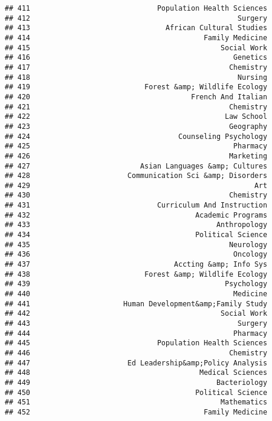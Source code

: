\documentclass[
]{article}
\begin{document}
\begin{verbatim}
## 411                              Population Health Sciences
## 412                                                 Surgery
## 413                                African Cultural Studies
## 414                                         Family Medicine
## 415                                             Social Work
## 416                                                Genetics
## 417                                               Chemistry
## 418                                                 Nursing
## 419                           Forest &amp; Wildlife Ecology
## 420                                      French And Italian
## 421                                               Chemistry
## 422                                              Law School
## 423                                               Geography
## 424                                   Counseling Psychology
## 425                                                Pharmacy
## 426                                               Marketing
## 427                          Asian Languages &amp; Cultures
## 428                       Communication Sci &amp; Disorders
## 429                                                     Art
## 430                                               Chemistry
## 431                              Curriculum And Instruction
## 432                                       Academic Programs
## 433                                            Anthropology
## 434                                       Political Science
## 435                                               Neurology
## 436                                                Oncology
## 437                                  Accting &amp; Info Sys
## 438                           Forest &amp; Wildlife Ecology
## 439                                              Psychology
## 440                                                Medicine
## 441                      Human Development&amp;Family Study
## 442                                             Social Work
## 443                                                 Surgery
## 444                                                Pharmacy
## 445                              Population Health Sciences
## 446                                               Chemistry
## 447                       Ed Leadership&amp;Policy Analysis
## 448                                        Medical Sciences
## 449                                            Bacteriology
## 450                                       Political Science
## 451                                             Mathematics
## 452                                         Family Medicine

\end{verbatim}
\end{document}
